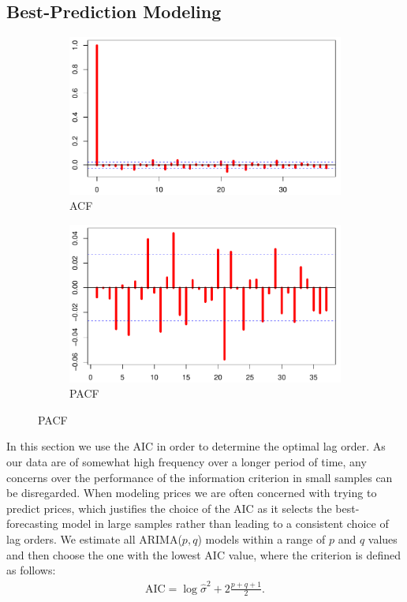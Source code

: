 \documentclass[a4paper]{article}
\theoremstyle{definition}
\begin{document}
\subsection{Best-Prediction Modeling}
\begin{figure}[t]
     \centering
     \caption{Empirical (Partial) Autocorrelation Functions of the Gold Price FDs}
     \begin{subfigure}[t]{0.45\textwidth}
         \caption{ACF}        
         \includegraphics[width=\textwidth]{acfGOLDFD}
    \end{subfigure}
    \begin{subfigure}[t]{0.45\textwidth}
         \caption{PACF}
         \includegraphics[width=\textwidth]{pacfGOLDFD}
    \end{subfigure}
\end{figure}

In this section we use the AIC in order to determine the optimal lag order. As our data are of somewhat high frequency over a longer period of time, any concerns over the performance of the information criterion in small samples can be disregarded. When modeling prices we are often concerned with trying to predict prices, which justifies the choice of the AIC as it selects the best-forecasting model in large samples rather than leading to a consistent choice of lag orders. We estimate all ARIMA($p,q$) models within a range of $p$ and $q$ values and then choose the one with the lowest AIC value, where the criterion is defined as follows:
	\begin{align*}
	\text{AIC} = \log \hat\sigma^2 + 2 \frac{p+q+1}{2}.
	\end{align*}
\end{document}
